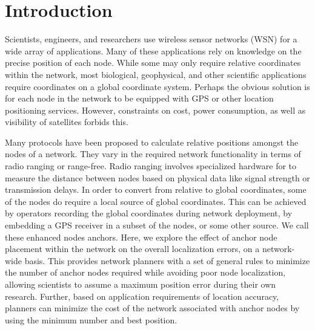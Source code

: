 \chapter{Introduction}

Scientists, engineers, and researchers use wireless sensor networks (WSN) for a wide array of applications. Many of these applications rely on knowledge on the precise position of each node. While some may only require relative coordinates within the network, most biological, geophysical, and other scientific applications require coordinates on a global coordinate system. Perhaps the obvious solution is for each node in the network to be equipped with GPS or other location positioning services.  However, constraints on cost, power consumption, as well as visibility of satellites forbids this.  

Many protocols have been proposed\cite{APS,MDS-MAP,CCA-MAP07} to calculate relative positions amongst the nodes of a network.  They vary in the required network functionality in terms of radio ranging or range-free.  Radio ranging involves specialized hardware for to measure the distance between nodes based on physical data like signal strength or transmission delays.  In order to convert from relative to global coordinates, some of the nodes do require a local source of global coordinates.  This can be achieved by operators recording the global coordinates during network deployment, by embedding a GPS receiver in a subset of the nodes, or some other source.  We call these enhanced nodes anchors.  Here, we explore the effect of anchor node placement within the network on the overall localization errors, on a network-wide basis. This provides network planners with a set of general rules to minimize the number of anchor nodes required while avoiding poor node localization, allowing scientists to assume a maximum position error during their own research.  Further, based on application requirements of location accuracy, planners can minimize the cost of the network associated with anchor nodes by using the minimum number and best position.

